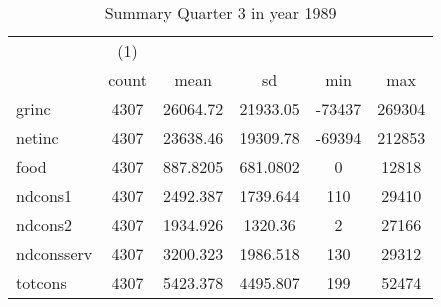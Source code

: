 \begin{table}[htbp]\centering
\def\sym#1{\ifmmode^{#1}\else\(^{#1}\)\fi}
\caption{Summary Quarter 3 in year 1989 \label{sum\_Q3\_y1989}}
\begin{tabular}{l*{1}{ccccc}}
\hline\hline
            &\multicolumn{1}{c}{(1)}&            &            &            &            \\
            &       count&        mean&          sd&         min&         max\\
\hline
grinc       &        4307&    26064.72&    21933.05&      -73437&      269304\\
netinc      &        4307&    23638.46&    19309.78&      -69394&      212853\\
food        &        4307&    887.8205&    681.0802&           0&       12818\\
ndcons1     &        4307&    2492.387&    1739.644&         110&       29410\\
ndcons2     &        4307&    1934.926&     1320.36&           2&       27166\\
ndconsserv  &        4307&    3200.323&    1986.518&         130&       29312\\
totcons     &        4307&    5423.378&    4495.807&         199&       52474\\
\hline\hline
\end{tabular}
\end{table}
